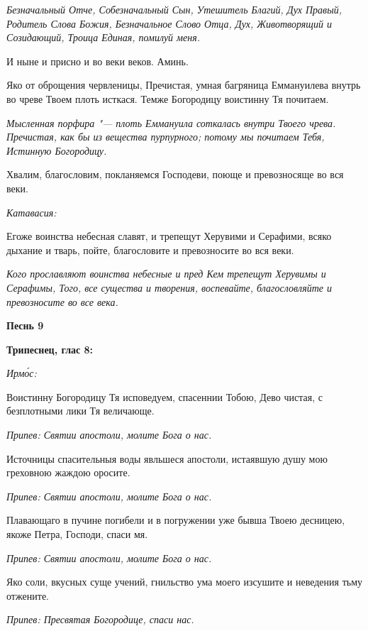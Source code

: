 \itshape Безначальный Отче, Собезначальный Сын, Утешитель Благий, Дух Правый, Родитель Слова Божия, Безначальное Слово Отца, Дух, Животворящий и Созидающий, Троица Единая, помилуй меня.\normalfont{}


И ныне и присно и во веки веков. Аминь.


Яко от оброщения червленицы, Пречистая, умная багряница Еммануилева внутрь во чреве Твоем плоть исткася. Темже Богородицу воистинну Тя почитаем.


\itshape Мысленная порфира "--- плоть Еммануила соткалась внутри Твоего чрева. Пречистая, как бы из вещества пурпурного; потому мы почитаем Тебя, Истинную Богородицу.\normalfont{}


Хвалим, благословим, покланяемся Господеви, поюще и превозносяще во вся веки.


\itshape Катавасия:\normalfont{}


Егоже воинства небесная славят, и трепещут Херувими и Серафими, всяко дыхание и тварь, пойте, благословите и превозносите во вся веки.


\itshape Кого прославляют воинства небесные и пред Кем трепещут Херувимы и Серафимы, Того, все существа и творения, воспевайте, благословляйте и превозносите во все века.\normalfont{}





\bfseries Песнь 9\normalfont{}





\bfseries Трипеснец, глас 8:\normalfont{}


\itshape Ирмо́с:\normalfont{}


Воистинну Богородицу Тя исповедуем, спасеннии Тобою, Дево чистая, с безплотными лики Тя величающе.


\itshape Припев:\normalfont{} Святии апостоли, молите Бога о нас.


Источницы спасительныя воды явльшеся апостоли, истаявшую душу мою греховною жаждою оросите.


\itshape Припев:\normalfont{} Святии апостоли, молите Бога о нас.


Плавающаго в пучине погибели и в погружении уже бывша Твоею десницею, якоже Петра, Господи, спаси мя.


\itshape Припев:\normalfont{} Святии апостоли, молите Бога о нас.


Яко соли, вкусных суще учений, гнильство ума моего изсушите и неведения тьму отжените.


\itshape Припев:\normalfont{} Пресвятая Богородице, спаси нас.


